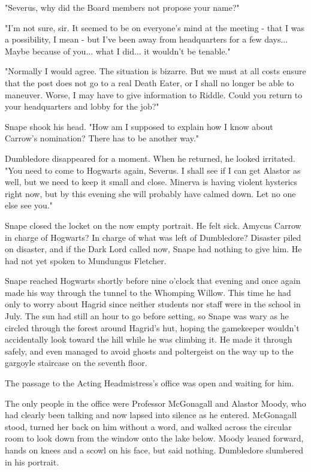 \documentclass[a4paper,11pt]{article}
\begin{document}
"Severus, why did the Board members not propose your name?"

"I'm not sure, sir. It seemed to be on everyone's mind at the meeting - that I was a possibility, I mean - but I've been away from headquarters for a few days... Maybe because of you... what I did... it wouldn't be tenable."

"Normally I would agree. The situation is bizarre. But we must at all costs ensure that the post does not go to a real Death Eater, or I shall no longer be able to maneuver. Worse, I may have to give information to Riddle. Could you return to your headquarters and lobby for the job?"

Snape shook his head. "How am I supposed to explain how I know about Carrow's nomination? There has to be another way."

Dumbledore disappeared for a moment. When he returned, he looked irritated. "You need to come to Hogwarts again, Severus. I shall see if I can get Alastor as well, but we need to keep it small and close. Minerva is having violent hysterics right now, but by this evening she will probably have calmed down. Let no one else see you."

Snape closed the locket on the now empty portrait. He felt sick. Amycus Carrow in charge of Hogwarts? In charge of what was left of Dumbledore? Disaster piled on disaster, and if the Dark Lord called now, Snape had nothing to give him. He had not yet spoken to Mundungus Fletcher.

Snape reached Hogwarts shortly before nine o'clock that evening and once again made his way through the tunnel to the Whomping Willow. This time he had only to worry about Hagrid since neither students nor staff were in the school in July. The sun had still an hour to go before setting, so Snape was wary as he circled through the forest around Hagrid's hut, hoping the gamekeeper wouldn't accidentally look toward the hill while he was climbing it. He made it through safely, and even managed to avoid ghosts and poltergeist on the way up to the gargoyle staircase on the seventh floor.

The passage to the Acting Headmistress's office was open and waiting for him.

The only people in the office were Professor McGonagall and Alastor Moody, who had clearly been talking and now lapsed into silence as he entered. McGonagall stood, turned her back on him without a word, and walked across the circular room to look down from the window onto the lake below. Moody leaned forward, hands on knees and a scowl on his face, but said nothing. Dumbledore slumbered in his portrait.
\end{document}
